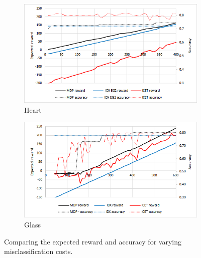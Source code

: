 \documentclass[letterpaper]{article}
\theoremstyle{definition}
\begin{document}
\begin{figure}[ht]
        \begin{subfigure}[t]{0.45\textwidth}\vskip 0pt
		\centering
		\includegraphics[scale=0.5]{Heart}
		\caption{Heart}\label{fig:Heart}		
	\end{subfigure}
    \quad
    \begin{subfigure}[t]{0.45\textwidth}\vskip 0pt
		\centering
		\includegraphics[scale=0.5]{Glass}
		\caption{Glass}\label{fig:Glass}		
	\end{subfigure}
    
    
    \quad
    \caption{Comparing the expected reward and accuracy for varying misclassification costs.}
    \label{fig:RewardVsAccuracy}
\end{figure}
\end{document}
